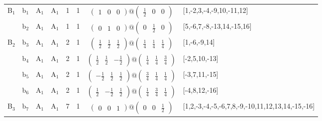\documentclass[fleqn,10pt,landscape]{article}
\begin{document}
\begin{itemize}
\begin{center}
\begin{longtable}{cc|cc|c|c|c|l}
B$_{1}$ & b$_{1}$ & A$_{1}$ & A$_{1}$ & 1 & 1 & $\begin{pmatrix} 1 & 0 & 0 \end{pmatrix}@\begin{pmatrix} \frac{1}{2} & 0 & 0 \end{pmatrix}$ & [1,-2,3,-4,-9,10,-11,12] \\
& b$_{2}$ & A$_{1}$ & A$_{1}$ & 1 & 1 & $\begin{pmatrix} 0 & 1 & 0 \end{pmatrix}@\begin{pmatrix} 0 & \frac{1}{2} & 0 \end{pmatrix}$ & [5,-6,7,-8,-13,14,-15,16] \\ \hline
B$_{2}$ & b$_{3}$ & A$_{1}$ & A$_{1}$ & 2 & 1 & $\begin{pmatrix} \frac{1}{2} & \frac{1}{2} & \frac{1}{2} \end{pmatrix}@\begin{pmatrix} \frac{1}{4} & \frac{1}{4} & \frac{1}{4} \end{pmatrix}$ & [1,-6,-9,14] \\
& b$_{4}$ & A$_{1}$ & A$_{1}$ & 2 & 1 & $\begin{pmatrix} \frac{1}{2} & \frac{1}{2} & - \frac{1}{2} \end{pmatrix}@\begin{pmatrix} \frac{1}{4} & \frac{1}{4} & \frac{3}{4} \end{pmatrix}$ & [-2,5,10,-13] \\
& b$_{5}$ & A$_{1}$ & A$_{1}$ & 2 & 1 & $\begin{pmatrix} - \frac{1}{2} & \frac{1}{2} & \frac{1}{2} \end{pmatrix}@\begin{pmatrix} \frac{3}{4} & \frac{1}{4} & \frac{1}{4} \end{pmatrix}$ & [-3,7,11,-15] \\
& b$_{6}$ & A$_{1}$ & A$_{1}$ & 2 & 1 & $\begin{pmatrix} \frac{1}{2} & - \frac{1}{2} & \frac{1}{2} \end{pmatrix}@\begin{pmatrix} \frac{1}{4} & \frac{3}{4} & \frac{1}{4} \end{pmatrix}$ & [-4,8,12,-16] \\ \hline
B$_{3}$ & b$_{7}$ & A$_{1}$ & A$_{1}$ & 7 & 1 & $\begin{pmatrix} 0 & 0 & 1 \end{pmatrix}@\begin{pmatrix} 0 & 0 & \frac{1}{2} \end{pmatrix}$ & [1,2,-3,-4,-5,-6,7,8,-9,-10,11,12,13,14,-15,-16] \\
\end{longtable}
\end{center}


\end{itemize}
\end{document}
